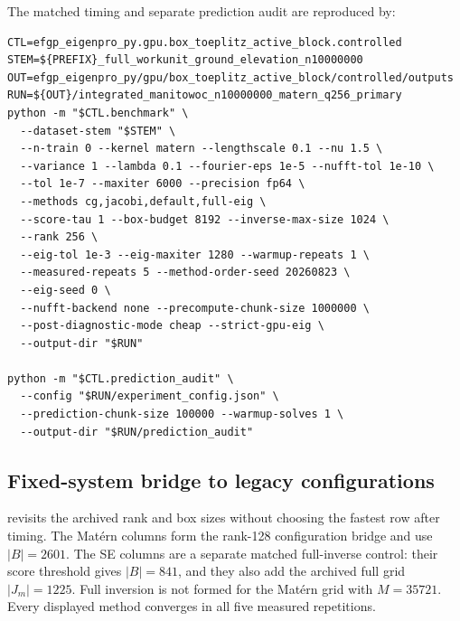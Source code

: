 The matched timing and separate prediction audit are reproduced by:

\begingroup\scriptsize
\begin{verbatim}
CTL=efgp_eigenpro_py.gpu.box_toeplitz_active_block.controlled
STEM=${PREFIX}_full_workunit_ground_elevation_n10000000
OUT=efgp_eigenpro_py/gpu/box_toeplitz_active_block/controlled/outputs
RUN=${OUT}/integrated_manitowoc_n10000000_matern_q256_primary
python -m "$CTL.benchmark" \
  --dataset-stem "$STEM" \
  --n-train 0 --kernel matern --lengthscale 0.1 --nu 1.5 \
  --variance 1 --lambda 0.1 --fourier-eps 1e-5 --nufft-tol 1e-10 \
  --tol 1e-7 --maxiter 6000 --precision fp64 \
  --methods cg,jacobi,default,full-eig \
  --score-tau 1 --box-budget 8192 --inverse-max-size 1024 \
  --rank 256 \
  --eig-tol 1e-3 --eig-maxiter 1280 --warmup-repeats 1 \
  --measured-repeats 5 --method-order-seed 20260823 \
  --eig-seed 0 \
  --nufft-backend none --precompute-chunk-size 1000000 \
  --post-diagnostic-mode cheap --strict-gpu-eig \
  --output-dir "$RUN"

python -m "$CTL.prediction_audit" \
  --config "$RUN/experiment_config.json" \
  --prediction-chunk-size 100000 --warmup-solves 1 \
  --output-dir "$RUN/prediction_audit"
\end{verbatim}
\endgroup

\subsection{Fixed-system bridge to legacy configurations}

\Cref{tab:matched-q128-bridge} revisits the archived rank and box sizes without
choosing the fastest row after timing.  The Mat\'ern columns form the rank-128
configuration bridge and use \(|B|=2601\).  The SE columns are a separate
matched full-inverse control: their score threshold gives \(|B|=841\), and
they also add the archived full grid \(|J_m|=1225\).  Full inversion is not
formed for the Mat\'ern grid with \(M=35721\).  Every displayed method
converges in all five measured repetitions.

